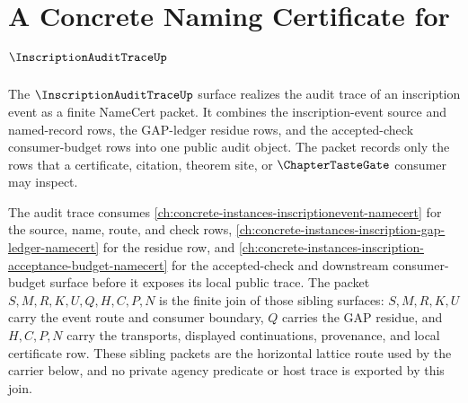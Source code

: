 \chapter{A Concrete Naming Certificate for $\InscriptionAuditTraceUp$}
\label{ch:concrete-instances-inscriptionaudittrace-namecert}

The $\InscriptionAuditTraceUp$ surface realizes the audit trace of an inscription event as a finite NameCert packet. It combines the inscription-event source and named-record rows, the GAP-ledger residue rows, and the accepted-check consumer-budget rows into one public audit object. The packet records only the rows that a certificate, citation, theorem site, or $\ChapterTasteGate$ consumer may inspect.

The audit trace consumes \autoref{ch:concrete-instances-inscriptionevent-namecert} for the source, name, route, and check rows, \autoref{ch:concrete-instances-inscription-gap-ledger-namecert} for the residue row, and \autoref{ch:concrete-instances-inscription-acceptance-budget-namecert} for the accepted-check and downstream consumer-budget surface before it exposes its local public trace. The packet $S,M,R,K,U,Q,H,C,P,N$ is the finite join of those sibling surfaces: $S,M,R,K,U$ carry the event route and consumer boundary, $Q$ carries the GAP residue, and $H,C,P,N$ carry the transports, displayed continuations, provenance, and local certificate row. These sibling packets are the horizontal lattice route used by the carrier below, and no private agency predicate or host trace is exported by this join.

